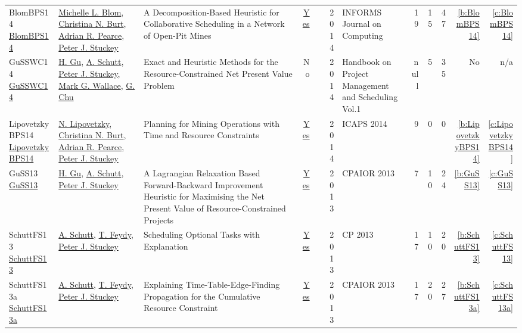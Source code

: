 {\begin{longtable}{>{\raggedright\arraybackslash}p{3cm}>{\raggedright\arraybackslash}p{6cm}>{\raggedright\arraybackslash}p{6.5cm}rrrp{2.5cm}rrrrr}
BlomBPS14 \href{https://doi.org/10.1287/ijoc.2013.0590}{BlomBPS14} & \hyperref[auth:a807]{Michelle L. Blom}, \hyperref[auth:a326]{Christina N. Burt}, \hyperref[auth:a328]{Adrian R. Pearce}, \hyperref[auth:a126]{Peter J. Stuckey} & A Decomposition-Based Heuristic for Collaborative Scheduling in a Network of Open-Pit Mines & \href{works/BlomBPS14.pdf}{Yes} & \cite{BlomBPS14} & 2014 & INFORMS Journal on Computing & 19 & 15 & 47 & \ref{b:BlomBPS14} & \ref{c:BlomBPS14}\\
GuSSWC14 \href{http://dx.doi.org/10.1007/978-3-319-05443-8_14}{GuSSWC14} & \hyperref[auth:a342]{H. Gu}, \hyperref[auth:a125]{A. Schutt}, \hyperref[auth:a126]{Peter J. Stuckey}, \hyperref[auth:a156]{Mark G. Wallace}, \hyperref[auth:a349]{G. Chu} & Exact and Heuristic Methods for the Resource-Constrained Net Present Value Problem & No & \cite{GuSSWC14} & 2014 & Handbook on Project Management and Scheduling Vol.1 & null & 5 & 35 & No & n/a\\
LipovetzkyBPS14 \href{http://www.aaai.org/ocs/index.php/ICAPS/ICAPS14/paper/view/7942}{LipovetzkyBPS14} & \hyperref[auth:a327]{N. Lipovetzky}, \hyperref[auth:a326]{Christina N. Burt}, \hyperref[auth:a328]{Adrian R. Pearce}, \hyperref[auth:a126]{Peter J. Stuckey} & Planning for Mining Operations with Time and Resource Constraints & \href{works/LipovetzkyBPS14.pdf}{Yes} & \cite{LipovetzkyBPS14} & 2014 & ICAPS 2014 & 9 & 0 & 0 & \ref{b:LipovetzkyBPS14} & \ref{c:LipovetzkyBPS14}\\
GuSS13 \href{https://doi.org/10.1007/978-3-642-38171-3\_24}{GuSS13} & \hyperref[auth:a342]{H. Gu}, \hyperref[auth:a125]{A. Schutt}, \hyperref[auth:a126]{Peter J. Stuckey} & A Lagrangian Relaxation Based Forward-Backward Improvement Heuristic for Maximising the Net Present Value of Resource-Constrained Projects & \href{works/GuSS13.pdf}{Yes} & \cite{GuSS13} & 2013 & CPAIOR 2013 & 7 & 10 & 24 & \ref{b:GuSS13} & \ref{c:GuSS13}\\
SchuttFS13 \href{https://doi.org/10.1007/978-3-642-40627-0\_47}{SchuttFS13} & \hyperref[auth:a125]{A. Schutt}, \hyperref[auth:a155]{T. Feydy}, \hyperref[auth:a126]{Peter J. Stuckey} & Scheduling Optional Tasks with Explanation & \href{works/SchuttFS13.pdf}{Yes} & \cite{SchuttFS13} & 2013 & CP 2013 & 17 & 10 & 20 & \ref{b:SchuttFS13} & \ref{c:SchuttFS13}\\
SchuttFS13a \href{https://doi.org/10.1007/978-3-642-38171-3\_16}{SchuttFS13a} & \hyperref[auth:a125]{A. Schutt}, \hyperref[auth:a155]{T. Feydy}, \hyperref[auth:a126]{Peter J. Stuckey} & Explaining Time-Table-Edge-Finding Propagation for the Cumulative Resource Constraint & \href{works/SchuttFS13a.pdf}{Yes} & \cite{SchuttFS13a} & 2013 & CPAIOR 2013 & 17 & 20 & 27 & \ref{b:SchuttFS13a} & \ref{c:SchuttFS13a}\\

\end{longtable}}
